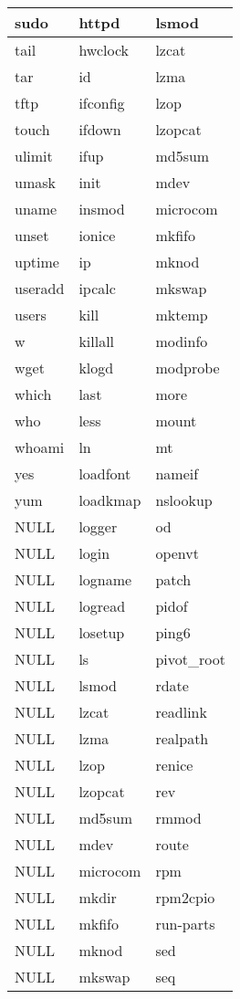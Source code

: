 \begin{longtable}{llp{64mm}}
sudo & httpd & lsmod \\ \hline
tail & hwclock & lzcat \\ \hline
tar & id & lzma \\ \hline
tftp & ifconfig & lzop \\ \hline
touch & ifdown & lzopcat \\ \hline
ulimit & ifup & md5sum \\ \hline
umask & init & mdev \\ \hline
uname & insmod & microcom \\ \hline
unset & ionice & mkfifo \\ \hline
uptime & ip & mknod \\ \hline
useradd & ipcalc & mkswap \\ \hline
users & kill & mktemp \\ \hline
w & killall & modinfo \\ \hline
wget & klogd & modprobe \\ \hline
which & last & more \\ \hline
who & less & mount \\ \hline
whoami & ln & mt \\ \hline
yes & loadfont & nameif \\ \hline
yum & loadkmap & nslookup \\ \hline
NULL & logger & od \\ \hline
NULL & login & openvt \\ \hline
NULL & logname & patch \\ \hline
NULL & logread & pidof \\ \hline
NULL & losetup & ping6 \\ \hline
NULL & ls & pivot_root \\ \hline
NULL & lsmod & rdate \\ \hline
NULL & lzcat & readlink \\ \hline
NULL & lzma & realpath \\ \hline
NULL & lzop & renice \\ \hline
NULL & lzopcat & rev \\ \hline
NULL & md5sum & rmmod \\ \hline
NULL & mdev & route \\ \hline
NULL & microcom & rpm \\ \hline
NULL & mkdir & rpm2cpio \\ \hline
NULL & mkfifo & run-parts \\ \hline
NULL & mknod & sed \\ \hline
NULL & mkswap & seq \\ \hline

\end{longtable}
